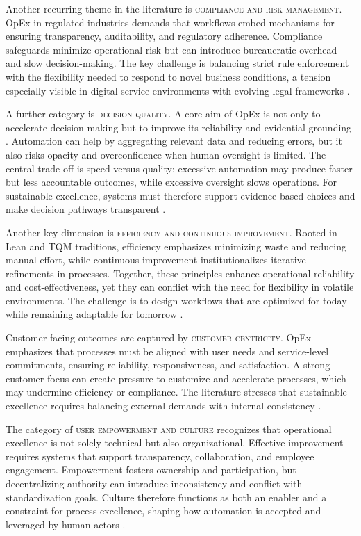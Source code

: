 Another recurring theme in the literature is \textsc{compliance and risk management}. OpEx in regulated industries demands that workflows embed mechanisms for ensuring transparency, auditability, and regulatory adherence. Compliance safeguards minimize operational risk but can introduce bureaucratic overhead and slow decision-making. The key challenge is balancing strict rule enforcement with the flexibility needed to respond to novel business conditions, a tension especially visible in digital service environments with evolving legal frameworks \parencite[cf.][p. 687]{owoadeSystematic2024}.

A further category is \textsc{decision quality}. A core aim of OpEx is not only to accelerate decision-making but to improve its reliability and evidential grounding \parencite[cf.][p. 685]{owoadeSystematic2024}. Automation can help by aggregating relevant data and reducing errors, but it also risks opacity and overconfidence when human oversight is limited. The central trade-off is speed versus quality: excessive automation may produce faster but less accountable outcomes, while excessive oversight slows operations. For sustainable excellence, systems must therefore support evidence-based choices and make decision pathways transparent \parencite{carvalhoOperational2023}.

Another key dimension is \textsc{efficiency and continuous improvement}. Rooted in Lean and TQM traditions, efficiency emphasizes minimizing waste and reducing manual effort, while continuous improvement institutionalizes iterative refinements in processes. Together, these principles enhance operational reliability and cost-effectiveness, yet they can conflict with the need for flexibility in volatile environments. The challenge is to design workflows that are optimized for today while remaining adaptable for tomorrow \parencite[cf.][p. 14.16 \& p. 8.1]{juranQuality1999}.

Customer-facing outcomes are captured by \textsc{customer-centricity}. OpEx emphasizes that processes must be aligned with user needs and service-level commitments, ensuring reliability, responsiveness, and satisfaction. A strong customer focus can create pressure to customize and accelerate processes, which may undermine efficiency or compliance. The literature stresses that sustainable excellence requires balancing external demands with internal consistency \parencite{womackLean1997,juranQuality1999}.

The category of \textsc{user empowerment and culture} recognizes that operational excellence is not solely technical but also organizational. Effective improvement requires systems that support transparency, collaboration, and employee engagement. Empowerment fosters ownership and participation, but decentralizing authority can introduce inconsistency and conflict with standardization goals. Culture therefore functions as both an enabler and a constraint for process excellence, shaping how automation is accepted and leveraged by human actors \parencite[cf.][p. 15.2-3]{juranQuality1999} \parencite[cf.][p.3]{womackLean1997}.

